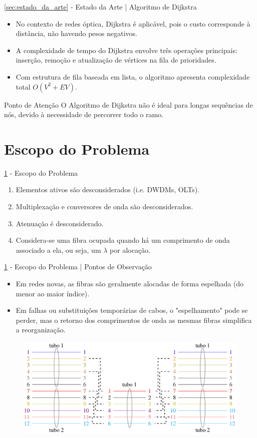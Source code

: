 \documentclass[aspectratio=169,xcolor=dvipsnames]{beamer}
\begin{document}
\begin{frame}{\ref{sec:estado_da_arte} - Estado da Arte | Algoritmo de Dijkstra}
  \begin{itemize}
    \item No contexto de redes óptica, Dijkstra é aplicável, pois o custo corresponde à distância, não havendo pesos negativos.
    \item A complexidade de tempo do Dijkstra envolve três operações principais: inserção, remoção e atualização de vértices na fila de prioridades.
    \item Com estrutura de fila baseada em lista, o algoritmo apresenta complexidade total $O(V^2 + EV)$.
  \end{itemize}

    \begin{alertblock}{Ponto de Atenção}
      O Algoritmo de Dijkstra não é ideal para longas sequências de nós, devido à necessidade de percorrer todo o ramo.
    \end{alertblock}
\end{frame}

\section{Escopo do Problema}\label{sec:escopo}
\begin{frame}{\ref{sec:escopo} - Escopo do Problema}
  \begin{enumerate}
    \item Elementos ativos são desconsiderados (i.e. DWDMs, OLTs).
    \item Multiplexação e conversores de onda são desconsiderados.
    \item Atenuação é desconsiderado.
    \item Considera-se uma fibra ocupada quando há um comprimento de onda associado a ela, ou seja, um $\lambda$ por alocação.
  \end{enumerate}
\end{frame}

\begin{frame}{\ref{sec:escopo} - Escopo do Problema | Pontos de Observação}
  \begin{itemize}
    \item Em redes novas, as fibras são geralmente alocadas de forma espelhada (do menor ao maior índice).
    \item Em falhas ou substituições temporárias de cabos, o "espelhamento" pode se perder, mas o retorno dos comprimentos de onda as mesmas fibras simplifica a reorganização.
  \end{itemize}
  \begin{figure}
    \includegraphics[width=0.70\linewidth]{../images/fluxo_reduzido.png}
  \end{figure}
\end{frame}
\end{document}
